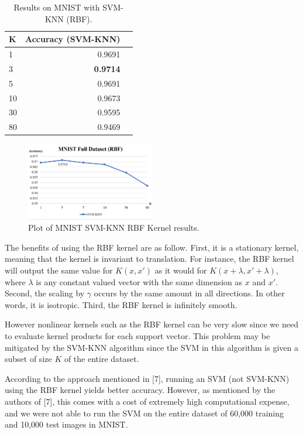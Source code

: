 \documentclass[11pt,letterpaper]{article}
\begin{document}
\begin{table}
\begin{center}
\begin{tabular}{|l|r|r|}
\hline \bf K & \bf Accuracy (SVM-KNN) \\ \hline
1 & 0.9691 \\
3 & \textbf{0.9714} \\
5 & 0.9691 \\
10 & 0.9673 \\
30 & 0.9595 \\
80 & 0.9469 \\
\hline
\end{tabular}
\end{center}
\caption{\label{knn-mnist} Results on MNIST with SVM-KNN (RBF). }
\end{table}

\begin{figure}[t!]
  \centering
  \includegraphics[keepaspectratio, width=0.5\textwidth]{mnist_full_rbf.png}
  \caption{Plot of MNIST SVM-KNN RBF Kernel results.}
\end{figure}

The benefits of using the RBF kernel are as follow. First, it is a stationary kernel, meaning that the kernel is invariant to translation. For instance, the RBF kernel will output the same value for $K(x,x')$ as it would for $K(x+\lambda, x'+\lambda)$, where $\lambda$ is any constant valued vector with the same dimension as $x$ and $x'$. Second, the scaling by $\gamma$ occurs by the same amount in all directions. In other words, it is isotropic. Third, the RBF kernel is infinitely smooth.

However nonlinear kernels such as the RBF kernel can be very slow since we need to evaluate kernel products for each support vector. This problem may be mitigated by the SVM-KNN algorithm since the SVM in this algorithm is given a subset of size $K$ of the entire dataset.

According to the approach mentioned in [7], running an SVM (not SVM-KNN) using the RBF kernel yields better accuracy. However, as mentioned by the authors of [7], this comes with a cost of extremely high computational expense, and we were not able to run the SVM on the entire dataset of 60,000 training and 10,000 test images in MNIST.
\end{document}
